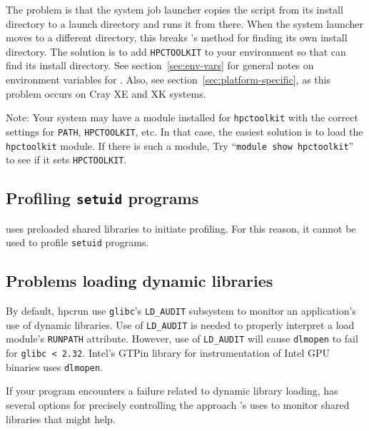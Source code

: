 \documentclass[11pt,twoside,letterpaper]{report}
\begin{document}
The problem is that the system job launcher copies the \hpcrun{}
script from its install directory to a launch directory and runs
it from there.  When the system launcher moves \hpcrun{} to a different directory, this
breaks \hpcrun{}'s method for finding its own install directory.
The solution is to add \verb|HPCTOOLKIT| to your environment so that
\hpcrun{} can find its install directory. See section~\ref{sec:env-vars} for
general notes on environment variables for \hpcrun{}. Also, see section~\ref{sec:platform-specific},
as this problem occurs on Cray XE and XK systems.

Note: Your system may have a module installed for \verb|hpctoolkit| with the
correct settings for \verb|PATH|, \verb|HPCTOOLKIT|, etc.  In that case,
the easiest solution is to load the \verb|hpctoolkit| module.  If there is
such a module, Try
``\verb|module show hpctoolkit|'' to see if it sets \verb|HPCTOOLKIT|.



\subsection{Profiling {\tt setuid} programs}

\hpcrun{} uses preloaded shared libraries to initiate profiling.  For this
reason, it cannot be used to profile {\tt setuid} programs.



\subsection{Problems loading dynamic libraries}

By default, hpcrun use {\tt glibc}'s {\tt LD\_AUDIT} subsystem to monitor an application's use of dynamic
  libraries. Use of  {\tt LD\_AUDIT}  is needed to properly interpret a load module's
  {\tt RUNPATH} attribute. However, use of {\tt LD\_AUDIT} will cause {\tt dlmopen} to fail 
  for \verb|glibc < 2.32|. Intel's GTPin library for instrumentation of Intel GPU 
  binaries uses {\tt dlmopen}.

If your program encounters a failure related to dynamic library loading, 
\hpcrun{} has several options for precisely controlling the approach \hpcrun{}'s uses to monitor shared libraries that might help.
\end{document}

